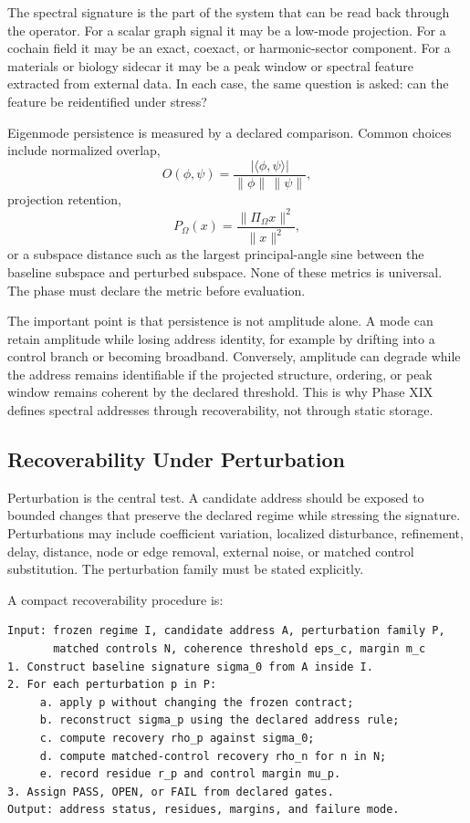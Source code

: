 \documentclass[11pt]{article}
\begin{document}
The spectral signature is the part of the system that can be read back through the operator. For a scalar graph signal it may be a low-mode projection. For a cochain field it may be an exact, coexact, or harmonic-sector component. For a materials or biology sidecar it may be a peak window or spectral feature extracted from external data. In each case, the same question is asked: can the feature be reidentified under stress?

Eigenmode persistence is measured by a declared comparison. Common choices include normalized overlap,
\[
O(\phi,\psi)=
\frac{|\langle \phi,\psi\rangle|}
{\|\phi\|\,\|\psi\|},
\]
projection retention,
\[
P_{\Omega}(x)
=
\frac{\|\Pi_{\Omega}x\|^2}{\|x\|^2},
\]
or a subspace distance such as the largest principal-angle sine between the baseline subspace and perturbed subspace. None of these metrics is universal. The phase must declare the metric before evaluation.

The important point is that persistence is not amplitude alone. A mode can retain amplitude while losing address identity, for example by drifting into a control branch or becoming broadband. Conversely, amplitude can degrade while the address remains identifiable if the projected structure, ordering, or peak window remains coherent by the declared threshold. This is why Phase XIX defines spectral addresses through recoverability, not through static storage.

\subsection{Recoverability Under Perturbation}

Perturbation is the central test. A candidate address should be exposed to bounded changes that preserve the declared regime while stressing the signature. Perturbations may include coefficient variation, localized disturbance, refinement, delay, distance, node or edge removal, external noise, or matched control substitution. The perturbation family must be stated explicitly.

A compact recoverability procedure is:

\begin{verbatim}
Input: frozen regime I, candidate address A, perturbation family P,
       matched controls N, coherence threshold eps_c, margin m_c
1. Construct baseline signature sigma_0 from A inside I.
2. For each perturbation p in P:
     a. apply p without changing the frozen contract;
     b. reconstruct sigma_p using the declared address rule;
     c. compute recovery rho_p against sigma_0;
     d. compute matched-control recovery rho_n for n in N;
     e. record residue r_p and control margin mu_p.
3. Assign PASS, OPEN, or FAIL from declared gates.
Output: address status, residues, margins, and failure mode.
\end{verbatim}
\end{document}
